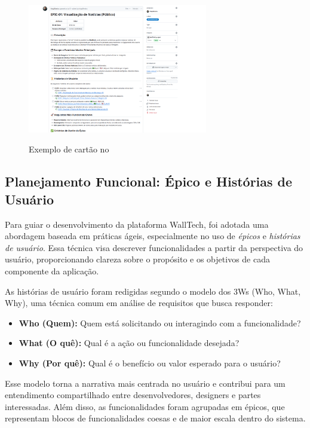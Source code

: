 \begin{figure}[H]
  \centering
  \caption{Exemplo de cartão  no }
  \includegraphics[width=0.7\textwidth]{media/wall_tech_epic.png}
  \label{fig:kanban-userstories}
\end{figure}




\subsection{Planejamento Funcional: Épico e Histórias de Usuário}

Para guiar o desenvolvimento da plataforma WallTech, foi adotada uma abordagem baseada em práticas ágeis, especialmente no uso de \textit{épicos} e \textit{histórias de usuário}. Essa técnica visa descrever funcionalidades a partir da perspectiva do usuário, proporcionando clareza sobre o propósito e os objetivos de cada componente da aplicação.

As histórias de usuário foram redigidas segundo o modelo dos 3Ws (Who, What, Why), uma técnica comum em análise de requisitos que busca responder:
\begin{itemize}
  \item \textbf{Who (Quem):} Quem está solicitando ou interagindo com a funcionalidade?
  \item \textbf{What (O quê):} Qual é a ação ou funcionalidade desejada?
  \item \textbf{Why (Por quê):} Qual é o benefício ou valor esperado para o usuário?
\end{itemize}

Esse modelo torna a narrativa mais centrada no usuário e contribui para um entendimento compartilhado entre desenvolvedores, designers e partes interessadas. Além disso, as funcionalidades foram agrupadas em épicos, que representam blocos de funcionalidades coesas e de maior escala dentro do sistema.

